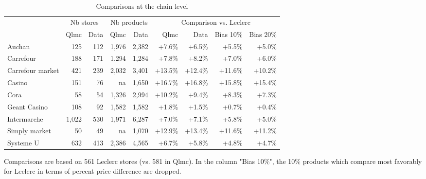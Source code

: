 \documentclass[english]{article}
\begin{document}
\begin{table}
\caption{Comparisons at the chain level}
\label{tab:qlmc_chain_comparisons}
\begin{threeparttable}
\begin{tabular}{lrr|rr|rrrr}
\toprule
\toprule
          & \multicolumn{2}{c|}{Nb stores} &  \multicolumn{2}{c|}{Nb products} & \multicolumn{4}{c}{Comparison vs. Leclerc} \\
           & Qlmc  & Data  & Qlmc  & Data  & Qlmc  & Data  & Bias 10\% & Bias 20\% \\
\midrule
    Auchan & 125   & 112   & 1,976 & 2,382 & +7.6\% & +6.5\% & +5.5\% & +5.0\% \\
    Carrefour & 188   & 171   & 1,294 & 1,284 & +7.8\% & +8.2\% & +7.0\% & +6.0\% \\
    Carrefour market & 421   & 239   & 2,032 & 3,401 & +13.5\% & +12.4\% & +11.6\% & +10.2\% \\
    Casino & 151   & 76    & na    & 1,650 & +16.7\% & +16.8\% & +15.8\% & +15.4\% \\
    Cora  & 58    & 54    & 1,326 & 2,994 & +10.2\% & +9.4\% & +8.3\% & +7.3\% \\
    Geant Casino & 108   & 92    & 1,582 & 1,582 & +1.8\% & +1.5\% & +0.7\% & +0.4\% \\
    Intermarche & 1,022 & 530   & 1,971 & 6,287 & +7.0\% & +7.1\% & +5.8\% & +5.0\% \\
    Simply market & 50    & 49    & na    & 1,070 & +12.9\% & +13.4\% & +11.6\% & +11.2\% \\
    Systeme U & 632   & 413   & 2,386 & 4,565 & +6.7\% & +5.8\% & +4.8\% & +4.7\% \\
\bottomrule
\bottomrule
\end{tabular}
\begin{tablenotes}
      \small
      \item Comparisons are based on 561 Leclerc stores (vs. 581 in Qlmc). In the column "Bias 10\%", the 10\% products which compare most favorably for Leclerc in terms of percent price difference are dropped.
\end{tablenotes}
\end{threeparttable}
\end{table}
\end{document}
